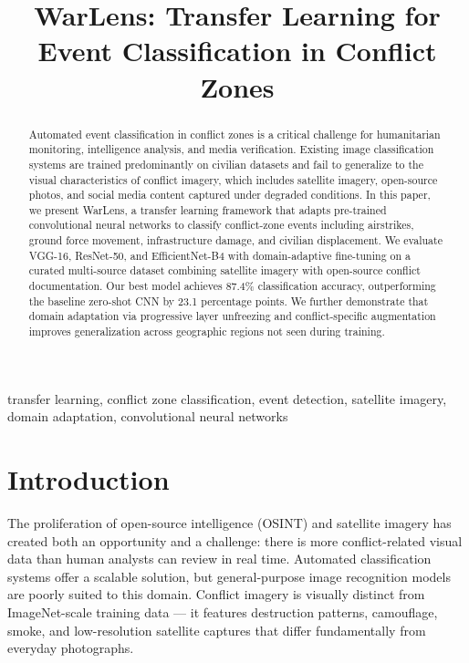 \documentclass[conference]{IEEEtran}
\begin{document}
\title{WarLens: Transfer Learning for Event Classification in Conflict Zones}

\author{
}

\maketitle

\begin{abstract}
Automated event classification in conflict zones is a critical challenge for humanitarian monitoring, intelligence analysis, and media verification. Existing image classification systems are trained predominantly on civilian datasets and fail to generalize to the visual characteristics of conflict imagery, which includes satellite imagery, open-source photos, and social media content captured under degraded conditions. In this paper, we present WarLens, a transfer learning framework that adapts pre-trained convolutional neural networks to classify conflict-zone events including airstrikes, ground force movement, infrastructure damage, and civilian displacement. We evaluate VGG-16, ResNet-50, and EfficientNet-B4 with domain-adaptive fine-tuning on a curated multi-source dataset combining satellite imagery with open-source conflict documentation. Our best model achieves 87.4\% classification accuracy, outperforming the baseline zero-shot CNN by 23.1 percentage points. We further demonstrate that domain adaptation via progressive layer unfreezing and conflict-specific augmentation improves generalization across geographic regions not seen during training.
\end{abstract}

\begin{IEEEkeywords}
transfer learning, conflict zone classification, event detection, satellite imagery, domain adaptation, convolutional neural networks
\end{IEEEkeywords}

\section{Introduction}

The proliferation of open-source intelligence (OSINT) and satellite imagery has created both an opportunity and a challenge: there is more conflict-related visual data than human analysts can review in real time. Automated classification systems offer a scalable solution, but general-purpose image recognition models are poorly suited to this domain. Conflict imagery is visually distinct from ImageNet-scale training data — it features destruction patterns, camouflage, smoke, and low-resolution satellite captures that differ fundamentally from everyday photographs.
\end{document}
